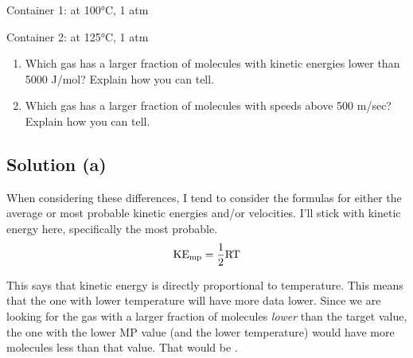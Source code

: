 \documentclass[10pt]{article}
\begin{document}
        Container 1:  at 100\unit{\celsius}, 1 atm 
        
        Container 2:  at 125\unit{\celsius}, 1 atm

        \begin{enumerate} [label=\alph*)]
            \item Which gas has a larger fraction of molecules with kinetic energies lower than 5000 J/mol? Explain how you can tell.
            \item Which gas has a larger fraction of molecules with speeds above 500 m/sec? Explain how you can tell.
        \end{enumerate}

        \subsection{Solution (a)}
            When considering these differences, I tend to consider the formulas for either the average or most probable kinetic energies and/or velocities.
            I'll stick with kinetic energy here, specifically the most probable.
            \begin{equation}
                \rm
                KE_{\rm mp} = \frac{1}{2}RT
            \end{equation}

            This says that kinetic energy is directly proportional to temperature. 
            This means that the one with lower temperature will have more data lower.
            Since we are looking for the gas with a larger fraction of molecules \textit{lower} than the target value, the one with the lower MP value (and the lower temperature) would have more molecules less than that value.
            That would be . 
\end{document}
